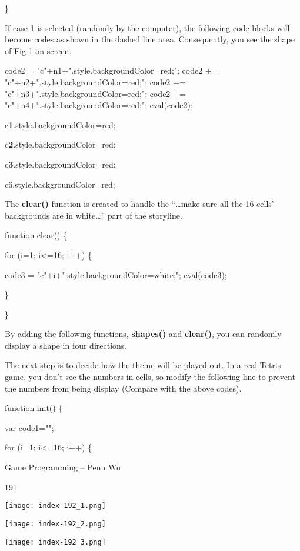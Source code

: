 \documentclass[
]{article}
\begin{document}
\}

If case 1 is selected (randomly by the computer), the following code
blocks will become codes as shown in the dashed line area. Consequently,
you see the shape of Fig 1 on screen.

code2 =
"c"+n1+".style.backgroundColor=\textquotesingle red\textquotesingle;";
code2 +=
"c"+n2+".style.backgroundColor=\textquotesingle red\textquotesingle;";
code2 +=
"c"+n3+".style.backgroundColor=\textquotesingle red\textquotesingle;";
code2 +=
"c"+n4+".style.backgroundColor=\textquotesingle red\textquotesingle;";
eval(code2);

c\textbf{1}.style.backgroundColor=\textquotesingle red\textquotesingle;

c\textbf{2}.style.backgroundColor=\textquotesingle red\textquotesingle;

c\textbf{3}.style.backgroundColor=\textquotesingle red\textquotesingle;

c6.style.backgroundColor=\textquotesingle red\textquotesingle;

The \textbf{clear()} function is created to handle the ``\ldots make
sure all the 16 cells' backgrounds are in white\ldots'' part of the
storyline.

function clear() \{

for (i=1; i\textless=16; i++) \{

code3 =
"c"+i+".style.backgroundColor=\textquotesingle white\textquotesingle;";
eval(code3);

\}

\}

By adding the following functions, \textbf{shapes()} and
\textbf{clear()}, you can randomly display a shape in four directions.

The next step is to decide how the theme will be played out. In a real
Tetris game, you don't see the numbers in cells, so modify the following
line to prevent the numbers from being display (Compare with the above
codes).

function init() \{

var code1="";

for (i=1; i\textless=16; i++) \{

Game Programming -- Penn Wu

191

\protect\hypertarget{index_split_011.htmlux5cux23p192}{}{}\texttt{[image: index-192\_1.png]}

\texttt{[image: index-192\_2.png]}

\texttt{[image: index-192\_3.png]}
\end{document}
